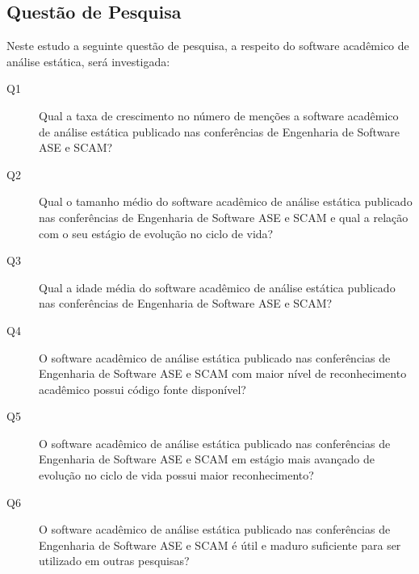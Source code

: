 
\subsection{Questão de Pesquisa}

Neste estudo a seguinte questão de pesquisa, a respeito do software acadêmico
de análise estática, será investigada:

\newcommand{\QuestaoUm}{
  Qual a taxa de crescimento no número de menções a software acadêmico de
  análise estática publicado nas conferências de Engenharia de Software ASE e
  SCAM?
}
\newcommand{\QuestaoDois}{
  Qual o tamanho médio do software acadêmico de análise estática publicado nas conferências de
  Engenharia de Software ASE e SCAM e qual a relação com o seu estágio de evolução no
  ciclo de vida?
}
\newcommand{\QuestaoTres}{
  Qual a idade média do software acadêmico de análise estática publicado nas conferências de
  Engenharia de Software ASE e SCAM?
}
\newcommand{\QuestaoQuatro}{
  O software acadêmico de análise estática publicado nas conferências de
  Engenharia de Software ASE e SCAM com maior nível de reconhecimento
  acadêmico possui código fonte disponível?
}
\newcommand{\QuestaoCinco}{
  O software acadêmico de análise estática publicado nas conferências de
  Engenharia de Software ASE e SCAM em estágio mais avançado de evolução
  no ciclo de vida possui maior reconhecimento?
}
\newcommand{\QuestaoSeis}{
  O software acadêmico de análise estática publicado nas conferências de
  Engenharia de Software ASE e SCAM é útil e maduro suficiente para ser
  utilizado em outras pesquisas?
}
\newcommand{\QuestaoSete}{
  O software acadêmico de análise estática publicado nas conferências de
  Engenharia de Software ASE e SCAM é sustentável tecnicamente?
}

\begin{description}
  \item [Q1] \QuestaoUm
  \item [Q2] \QuestaoDois
  \item [Q3] \QuestaoTres
  \item [Q4] \QuestaoQuatro
  \item [Q5] \QuestaoCinco
  \item [Q6] \QuestaoSeis
\end{description}

